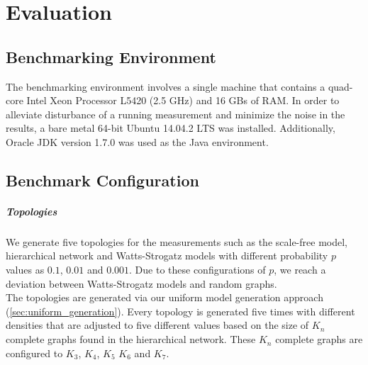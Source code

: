 
\chapter{Evaluation}\label{chapter:evaluation}



\section{Benchmarking Environment}

The benchmarking environment involves a single machine that contains a quad-core Intel Xeon Processor L5420 (2.5 GHz) and 16 GBs of RAM. In order to alleviate disturbance of a running measurement and minimize the noise in the results, a bare metal 64-bit Ubuntu 14.04.2 LTS was installed. Additionally, Oracle JDK version 1.7.0 was used as the Java environment.


\section{Benchmark Configuration}

\paragraph{Topologies}

We generate five topologies for the measurements such as the scale-free model, hierarchical network and Watts-Strogatz models with different probability $p$ values as $0.1$, $0.01$ and $0.001$. Due to these configurations of $p$, we reach a deviation between Watts-Strogatz models and random graphs.\\ The topologies are generated via our uniform model generation approach (\ref{sec:uniform_generation}).
Every topology is generated five times with different densities that are adjusted to five different values based on the size of $K_n$ complete graphs found in the hierarchical network. These $K_n$ complete graphs are configured to $K_3$, $K_4$, $K_5$ $K_6$ and $K_7$.

